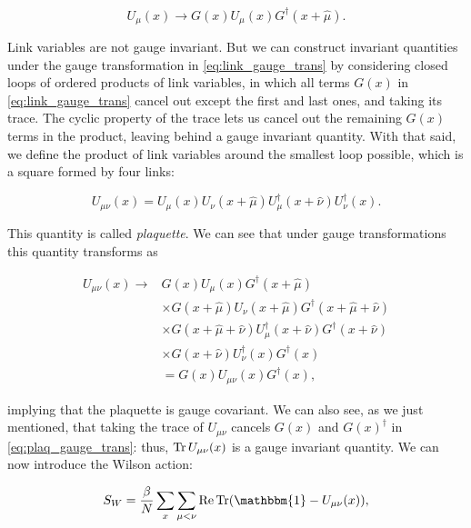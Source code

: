 \documentclass[reqno,12pt]{article}
\numberwithin{equation}{section}
\newcommand{\id}{\mathbbm{1}}
\begin{document}
\begin{equation} \label{eq:link_gauge_trans}
	U_\mu(x) \rightarrow G(x) U_\mu(x) G^\dagger(x + \hat{\mu}).
\end{equation}

Link variables are not gauge invariant. But we can construct invariant quantities under the gauge transformation in \eqref{eq:link_gauge_trans}
by considering closed loops of
ordered products of link variables, in which all terms $G(x)$ in \eqref{eq:link_gauge_trans} cancel out except the first and
last ones, and taking its trace. The cyclic property of the trace lets us cancel out the remaining $G(x)$ terms in the product,
leaving behind a gauge invariant quantity. With that said, we define the product of link variables around the smallest
loop possible, which is a square formed by four links:

\begin{equation} \label{eq:plaquette}
	U_{\mu\nu}(x) = U_\mu(x) U_\nu(x + \hat{\mu}) U_\mu^\dagger(x + \hat{\nu}) U_\nu^\dagger(x).
\end{equation}

This quantity is called \textit{plaquette}. We can see that under gauge transformations this quantity transforms as

\begin{equation} \label{eq:plaq_gauge_trans}
	\begin{aligned}
		U_{\mu\nu}(x) \rightarrow &G(x) U_\mu(x) G^\dagger(x + \hat{\mu}) \\ 
			&\times G(x + \hat{\mu}) U_\nu(x + \hat{\mu}) G^\dagger(x + \hat{\mu} + \hat{\nu})  \\
			&\times G(x + \hat{\mu} + \hat{\nu}) U_\mu^\dagger(x + \hat{\nu}) G^\dagger(x + \hat{\nu})  \\
			&\times G(x + \hat{\nu}) U_\nu^\dagger(x) G^\dagger(x) \\
			&= G(x) U_{\mu\nu}(x) G^\dagger(x),
	\end{aligned}	
\end{equation}

implying that the plaquette is gauge covariant. We can also see, as we just mentioned, that taking the trace of $U_{\mu\nu}$
cancels $G(x)$ and $G(x)^\dagger$ in \eqref{eq:plaq_gauge_trans}: thus, $\Tr U_{\mu\nu}(x)$ is a gauge invariant quantity.
We can now introduce the Wilson action:

\begin{equation} \label{eq:wilson_action}
	S_W = \frac{\beta}{N} \sum_x \sum_{\mu<\nu} \Re \Tr(\id - U_{\mu\nu}(x)),
\end{equation}
\end{document}
